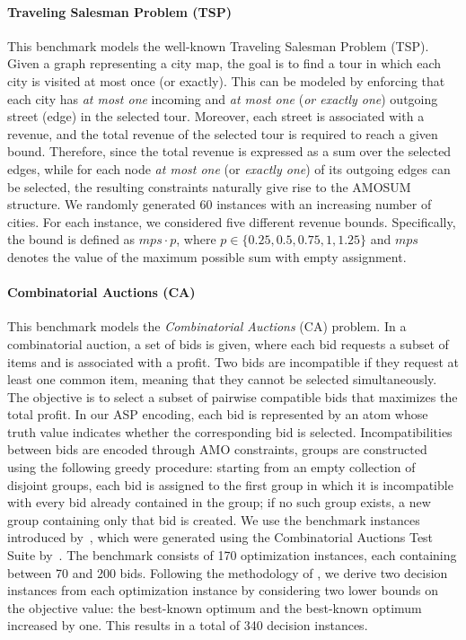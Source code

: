 \documentclass[preprint,authoryear]{elsarticle}
\newcommand{\mps}{\mathit{mps}}
\theoremstyle{definition}
\begin{document}
{\color{blue}
\paragraph{Traveling Salesman Problem (TSP)}
This benchmark models the well-known Traveling Salesman Problem (TSP). Given a graph representing a city map, the goal is to find a tour in which each city is visited at most once (or exactly). This can be modeled by enforcing that each city has \textit{at most one} incoming and \textit{at most one} (\textit{or exactly one}) outgoing street (edge) in the selected tour.
Moreover, each street is associated with a revenue, and the total revenue of the selected tour is required to reach a given bound. Therefore, since the total revenue is expressed as a sum over the selected edges, while for each node \textit{at most one} (or \textit{exactly one}) of its outgoing edges can be selected, the resulting constraints naturally give rise to the AMOSUM structure.
We randomly generated 60 instances with an increasing number of cities. For each instance, we considered five different revenue bounds. Specifically, the bound is defined as $\mps \cdot p$, where $p \in \{0.25, 0.5, 0.75, 1, 1.25\}$ and $\mps$ denotes the value of the maximum possible sum with empty assignment.

\paragraph{Combinatorial Auctions (CA)}
This benchmark models the \emph{Combinatorial Auctions} (CA) problem. In a combinatorial auction, a set of bids is given, where each bid requests a subset of items and is associated with a profit. Two bids are incompatible if they request at least one common item, meaning that they cannot be selected simultaneously. The objective is to select a subset of pairwise compatible bids that maximizes the total profit.
%
In our ASP encoding, each bid is represented by an atom whose truth value indicates whether the corresponding bid is selected. Incompatibilities between bids are encoded through AMO constraints, groups are constructed using the following greedy procedure: starting from an empty collection of disjoint groups, each bid is assigned to the first group in which it is incompatible with every bid already contained in the group; if no such group exists, a new group containing only that bid is created.
%
We use the benchmark instances introduced by~\cite{DBLP:conf/cp/BofillPSV14}, which were generated using the Combinatorial Auctions Test Suite by~\cite{leyton2006test}. The benchmark consists of 170 optimization instances, each containing between 70 and 200 bids. Following the methodology of \cite{DBLP:conf/cp/BofillPSV14}, we derive two decision instances from each optimization instance by considering two lower bounds on the objective value: the best-known optimum and the best-known optimum increased by one. This results in a total of 340 decision instances.

}
\end{document}
